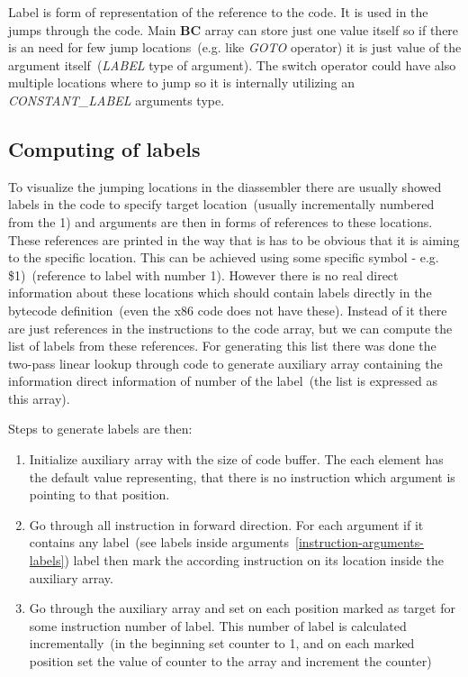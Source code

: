 \documentclass[thesis=M,english]{FITthesis}[2018/10/20]
\begin{document}
Label is form of representation of the reference to the code. It is used in the jumps through the code. Main \textbf{BC} array can store just one value itself so if there is an need for few jump locations~(e.g. like \textit{GOTO} operator) it is just value of the argument itself~(\textit{LABEL} type of argument). The switch operator could have also multiple locations where to jump so it is internally utilizing an \textit{CONSTANT{\_}LABEL} arguments type.

\subsection{Computing of labels}

To visualize the jumping locations in the diassembler there are usually showed labels in the code to specify target location~(usually incrementally numbered from the 1) and arguments are then in forms of references to these locations. These references are printed in the way that is has to be obvious that it is aiming to the specific location. This can be achieved using some specific symbol - e.g. {\$}1)~(reference to label with number 1). 
However there is no real direct information about these locations which should contain labels directly in the bytecode definition~(even the x86 code does not have these). Instead of it there are just references in the instructions to the code array, but we can compute the list of labels from these references. For generating this list there was done the two-pass linear lookup through code to generate auxiliary array containing the information direct information of number of the label~(the list is expressed as this array).

Steps to generate labels are then:
\begin{enumerate}
	\item Initialize auxiliary array with the size of code buffer. The each element has the default value representing, that there is no instruction which argument is pointing to that position.
	\item Go through all instruction in forward direction. For each argument if it contains any label~(see labels inside arguments~\ref{instruction-arguments-labels}) label then mark the according instruction on its location inside the auxiliary array.
	\item Go through the auxiliary array and set on each position marked as target for some instruction number of label. This number of label is calculated incrementally~(in the beginning set counter to 1, and on each marked position set the value of counter to the array and increment the counter)
\end{enumerate}
\end{document}
